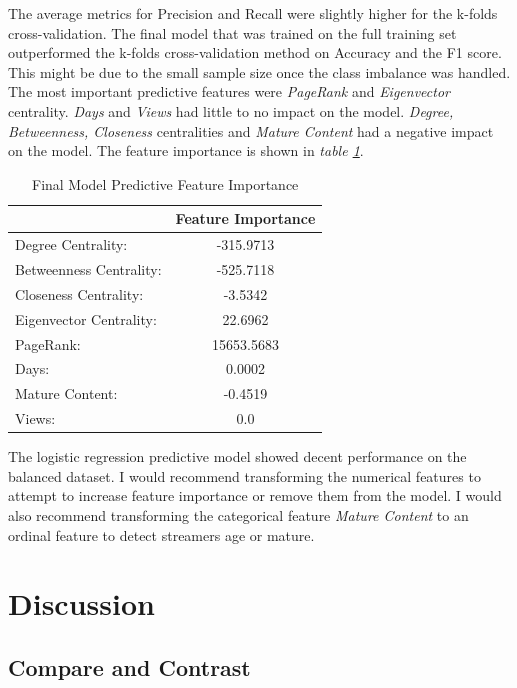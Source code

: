 \documentclass[10pt]{article}
\begin{document}
The average metrics for Precision and Recall were slightly higher for the
k-folds cross-validation. The final model that was trained on the full
training set outperformed the k-folds cross-validation method on Accuracy
and the F1 score. This might be due to the small sample size once the class
imbalance was handled. The most important predictive features were
\textit{PageRank} and  \textit{Eigenvector} centrality.
\textit{Days} and \textit{Views}  had little to no impact on the model.
\textit{Degree, Betweenness, Closeness} centralities and
\textit{Mature Content} had a negative impact on the model. The feature
importance is shown in \textit{table \ref{tab:feat_imp}}.

\begin{table}[H]
\footnotesize
\centering
\begin{tabular}{l c}
\hline
    {} & \bf{Feature Importance} \\
\hline
    Degree Centrality: & -315.9713 \\
    Betweenness Centrality: & -525.7118 \\
    Closeness Centrality: & -3.5342 \\
    Eigenvector Centrality: & 22.6962 \\
    PageRank: & 15653.5683 \\
    Days: & 0.0002 \\
    Mature Content: & -0.4519 \\
    Views: & 0.0 \\
\hline
\end{tabular}
\caption{Final Model Predictive Feature Importance}
\label{tab:feat_imp}
\end{table}

The logistic regression predictive model showed decent
performance on the balanced dataset. I would recommend
transforming the numerical features to attempt to increase
feature importance or remove them from the model.
I would also recommend transforming the categorical feature
\textit{Mature Content} to an ordinal feature to detect
streamers age or mature.


\section{Discussion}

\subsection{Compare and Contrast}
\end{document}
